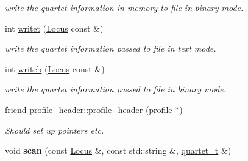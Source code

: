 \begin{DoxyCompactItemize}
\begin{DoxyCompactList}\small\item\em write the quartet information in memory to file in binary mode. \end{DoxyCompactList}\item 
\hypertarget{classprofile_aa5a278a2f46f80581fb96360414fe89a}{int \hyperlink{classprofile_aa5a278a2f46f80581fb96360414fe89a}{writet} (\hyperlink{classLocus}{Locus} const \&)}\label{classprofile_aa5a278a2f46f80581fb96360414fe89a}

\begin{DoxyCompactList}\small\item\em write the quartet information passed to file in text mode. \end{DoxyCompactList}\item 
\hypertarget{classprofile_a7d52885cad038fb7cb06f6a98b4fe3de}{int \hyperlink{classprofile_a7d52885cad038fb7cb06f6a98b4fe3de}{writeb} (\hyperlink{classLocus}{Locus} const \&)}\label{classprofile_a7d52885cad038fb7cb06f6a98b4fe3de}

\begin{DoxyCompactList}\small\item\em write the quartet information passed to file in binary mode. \end{DoxyCompactList}\item 
\hypertarget{classprofile_a4507830b35e82d604067749aa9be0f5f}{friend \hyperlink{classprofile_a4507830b35e82d604067749aa9be0f5f}{profile\-\_\-header\-::profile\-\_\-header} (\hyperlink{classprofile}{profile} $\ast$)}\label{classprofile_a4507830b35e82d604067749aa9be0f5f}

\begin{DoxyCompactList}\small\item\em Should set up pointers etc. \end{DoxyCompactList}\item 
\hypertarget{classprofile_a2ec404135f23eff175da3301b7a5d609}{void {\bfseries scan} (const \hyperlink{classLocus}{Locus} \&, const std\-::string \&, \hyperlink{structquartet}{quartet\-\_\-t} \&)}\label{classprofile_a2ec404135f23eff175da3301b7a5d609}

\end{DoxyCompactItemize}
